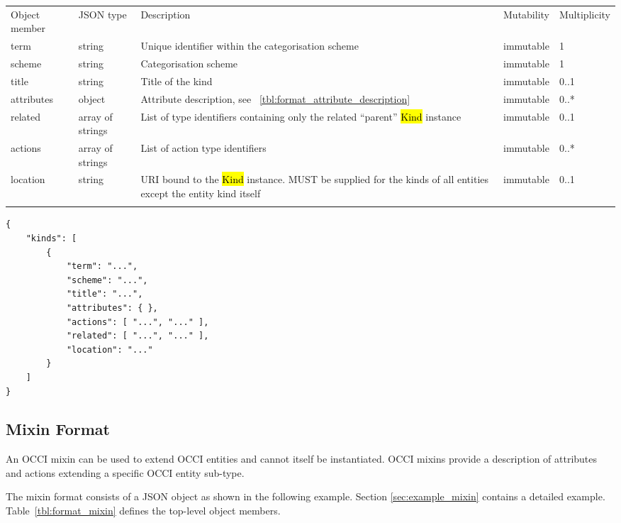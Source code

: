 \documentclass[10pt,a4paper]{article}
\begin{document}
 {
    \begin{tabularx}{\textwidth}{llXll}
    \toprule
    Object member & JSON type & Description & Mutability & Multiplicity \\
    \colrule
    term & string & Unique identifier within the categorisation scheme &
immutable & 1 \\
    scheme & string & Categorisation scheme & immutable & 1 \\
    title & string & Title of the kind & immutable & 0..1 \\
    attributes & object & Attribute description, see
~\ref{tbl:format_attribute_description} & immutable & 0..* \\
    related & array of strings & List of type identifiers containing only the
related ``parent''
\hl{Kind} instance & immutable & 0..1 \\
    actions & array of strings & List of action type identifiers & immutable &
0..*
\\
    location & string & URI bound to the \hl{Kind} instance. MUST be
supplied for the kinds of all entities except the entity kind itself & immutable
& 0..1 \\
    \botrule
    \end{tabularx}
}

\begin{verbatim}
{
    "kinds": [
        {
            "term": "...",
            "scheme": "...",
            "title": "...",
            "attributes": { },
            "actions": [ "...", "..." ],
            "related": [ "...", "..." ],
            "location": "..."
        }
    ]
}
\end{verbatim}

\subsection{Mixin Format}
\label{sec:format_mixin}

An OCCI mixin can be used to extend OCCI entities and cannot itself be 
instantiated. OCCI mixins provide a description of attributes and actions
extending a specific OCCI entity sub-type.

The mixin format consists of a JSON object as shown in the
following example. Section \ref{sec:example_mixin} contains a detailed example.
Table~\ref{tbl:format_mixin} defines the top-level object members.
\end{document}

